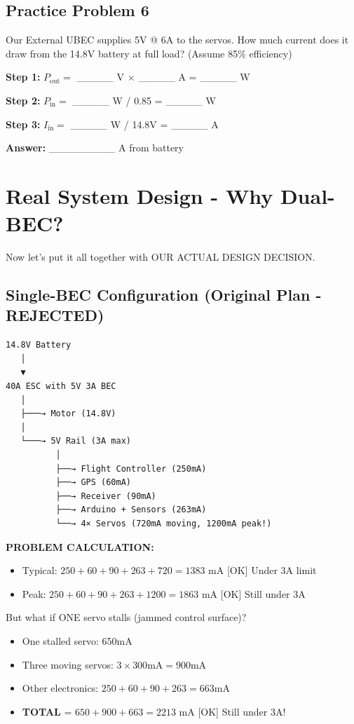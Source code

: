\documentclass[11pt,letterpaper]{article}
\begin{document}
\subsection{Practice Problem 6}

Our External UBEC supplies 5V @ 6A to the servos. How much current does it draw from the 14.8V battery at full load? (Assume 85\% efficiency)

\textbf{Step 1:} $P_{\text{out}} = $ \_\_\_\_\_ V $\times$ \_\_\_\_\_ A = \_\_\_\_\_ W

\textbf{Step 2:} $P_{\text{in}} = $ \_\_\_\_\_ W / 0.85 = \_\_\_\_\_ W

\textbf{Step 3:} $I_{\text{in}} = $ \_\_\_\_\_ W / 14.8V = \_\_\_\_\_ A

\textbf{Answer:} \_\_\_\_\_\_\_\_\_ A from battery

\section{Real System Design - Why Dual-BEC?}

Now let's put it all together with OUR ACTUAL DESIGN DECISION.

\subsection{Single-BEC Configuration (Original Plan - REJECTED)}

\begin{verbatim}
14.8V Battery
   │
   ▼
40A ESC with 5V 3A BEC
   │
   ├───→ Motor (14.8V)
   │
   └───→ 5V Rail (3A max)
          │
          ├──→ Flight Controller (250mA)
          ├──→ GPS (60mA)
          ├──→ Receiver (90mA)
          ├──→ Arduino + Sensors (263mA)
          └──→ 4× Servos (720mA moving, 1200mA peak!)
\end{verbatim}

\textbf{PROBLEM CALCULATION:}
\begin{itemize}
  \item Typical: $250 + 60 + 90 + 263 + 720 = 1383\text{ mA}$ [OK] Under 3A limit
  \item Peak: $250 + 60 + 90 + 263 + 1200 = 1863\text{ mA}$ [OK] Still under 3A
\end{itemize}

But what if ONE servo stalls (jammed control surface)?
\begin{itemize}
  \item One stalled servo: 650mA
  \item Three moving servos: $3 \times 300\text{mA} = 900\text{mA}$
  \item Other electronics: $250 + 60 + 90 + 263 = 663\text{mA}$
  \item \textbf{TOTAL} = $650 + 900 + 663 = 2213\text{ mA}$ [OK] Still under 3A!
\end{itemize}
\end{document}
